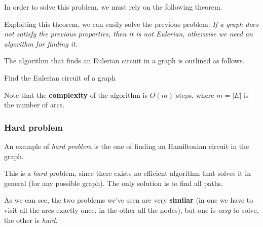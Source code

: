 In order to solve this problem, we must rely on the following theorem.


Exploiting this theorem, we can easily solve the previous problem: \textit{If a graph does not satisfy the previous properties, then it is not Eulerian, otherwise we need an algorithm for finding it}. 

The algorithm that finds an Eulerian circuit in a graph is outlined as follows.

\begin{algorithm} \caption{Find the Eulerian circuit of a graph}
  
\end{algorithm}

Note that the \textbf{complexity} of the algorithm is $O(m)$ steps, where $m=|E|$ is the number of arcs.

\subsubsection{Hard problem}
An example of \textit{hard problem} is the one of finding an Hamiltonian circuit in the graph.


This is a \textit{hard} problem, since there exists no efficient algorithm that solves it in general (for any possible graph). The only solution is to find all paths.

As we can see, the two problems we've seen are very \textbf{similar} (in one we have to visit all the arcs exactly once, in the other all the nodes), but one is \textit{easy} to solve, the other is \textit{hard}.

